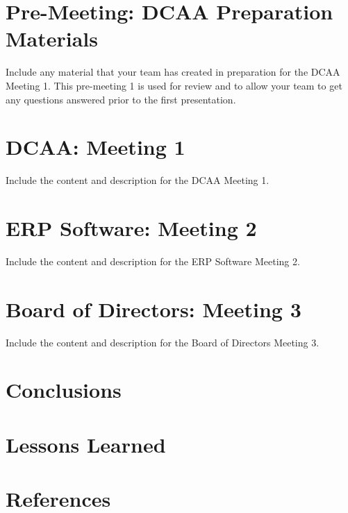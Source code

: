 \documentclass{ipfwpaper}
\begin{document}
\section{Pre-Meeting: DCAA Preparation Materials}
    Include any material that your team has created in preparation for the DCAA Meeting 1. This pre-meeting 1 is used for review and to allow your team to get any questions answered prior to the first presentation. 
    
\section{DCAA: Meeting 1}
    Include the content and description for the DCAA Meeting 1.
    
\section{ERP Software: Meeting 2}
    Include the content and description for the ERP Software Meeting 2.
    
\section{Board of Directors: Meeting 3} 
    Include the content and description for the Board of Directors Meeting 3.
    
 \clearpage      
\section{Conclusions}
\section{Lessons Learned}

\section{References}
    
    
\appendix





       
 
\end{document}
